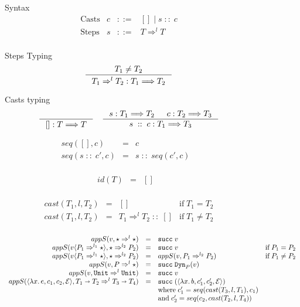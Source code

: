 \documentclass[acmsmall,review]{acmart}\settopmatter{printfolios=true,printccs=false,printacmref=false}
\newcommand{\stxrule}[3]{\text{#2} & #1 & ::= & #3\\}
\newcommand{\funrule}[3]{#1 &=& #2 & #3\\}
\newcommand{\judgeTypeFT}[3]{#1 : #2 \Longrightarrow #3} %
\newcommand{\POOunit}[0]{\mathtt{Unit}}
\newcommand{\POOfun}[2]{#1 \shortrightarrow #2}
\newcommand{\cOOcast}[3]{#1 \Rightarrow^{#2} #3}
\newcommand{\vOOcast}[2]{#1\langle#2\rangle}
\newcommand{\rOOsucc}[1]{\mathtt{succ}\;#1}
\newcommand{\hcvOOinj}[2]{\mathtt{Dyn}_{#1}(#2)}
\newcommand{\hcvOOfun}[5]{\langle \lambda #3.\, #4 , #1 , #5, #2 \rangle}
\newcommand{\sidecond}[1]{\text{if}\;#1}
\newcommand{\lsOOcast}[3]{\cOOcast{#1}{#2}{#3}}
\newcommand{\lcOOnull}[0]{[]}
\newcommand{\lcOOcons}[2]{#1 \; :: \; #2}
\begin{document}
\begin{figure}
Syntax
\[
\begin{array}{lrcl}
\stxrule{c}{Casts}{\lcOOnull{} \mid \lcOOcons{s}{c}}
\stxrule{s}{Steps}{\lsOOcast{T}{l}{T}}
\end{array}
\]

Steps Typing
\fbox{$\judgeTypeFT{s}{T}{T}$}
\begin{gather*}
\inference{
  T_1 \neq T_2
}{
  \judgeTypeFT{\lsOOcast{T_1}{l}{T_2}}{T_1}{T_2}
}
\end{gather*}

Casts typing
\fbox{$\judgeTypeFT{c}{T}{T}$}
\begin{gather*}
\inference{
}{
  \judgeTypeFT{\lcOOnull}{T}{T}
}
\quad
\inference{
  \judgeTypeFT{s}{T_1}{T_2} &
  \judgeTypeFT{c}{T_2}{T_3}
}{
  \judgeTypeFT{\lcOOcons{s}{c}}{T_1}{T_3}
}
\end{gather*}

\[
\begin{array}{rclr}
\funrule{seq(\lcOOnull,c)}{c}{}
\funrule{seq(\lcOOcons{s}{c'},c)}{\lcOOcons{s}{seq(c',c)}}{}
\end{array}
\]

\[
\begin{array}{rclr}
\funrule{id(T)}{\lcOOnull}{}
\end{array}
\]

\[
\begin{array}{rclc}
\funrule{cast(T_1,l,T_2)}{
  \lcOOnull
}{
  \sidecond{T_1 = T_2}
}
\funrule{cast(T_1,l,T_2)}{
  \lcOOcons{\lsOOcast{T_1}{l}{T_2}}{\lcOOnull}
}{
  \sidecond{T_1 \neq T_2}
}
\end{array}
\]

  
\[
\begin{array}{rclr}
\funrule{
  appS(v,\cOOcast{\star}{l}{\star})
}{
  \rOOsucc{v}
}{}
\funrule{
  appS(\vOOcast{v}{\cOOcast{P_1}{l_1}{\star}},\cOOcast{\star}{l_2}{P_2})
}{
  \rOOsucc{v}
}{\sidecond{P_1 = P_2}}
\funrule{
appS(\vOOcast{v}{\cOOcast{P_1}{l_1}{\star}},\cOOcast{\star}{l_2}{P_2})
}{
appS(v,\cOOcast{P_1}{l_2}{P_2})
}{\sidecond{P_1 \neq P_2}}
\funrule{
  appS(v,\cOOcast{P}{l}{\star})
}{
  \rOOsucc{\hcvOOinj{P}{v}}
}{}
\funrule{
  appS(v,\lsOOcast{\POOunit}{l}{\POOunit})
}{
  \rOOsucc{v}
}{}
\funrule{
  appS(
    \hcvOOfun{c_1}{\mathcal{E}}{x}{e}{c_2},
    \lsOOcast{\POOfun{T_1}{T_2}}{l}{\POOfun{T_3}{T_4}})
}{
  \rOOsucc{(\hcvOOfun{c_1'}{\mathcal{E}}{x}{b}{c_2'})}
}{
  \\ &&
  \text{where} \;
  c_1' = seq(cast(T_3,l,T_1),c_1)
  \\ &&
  \text{and} \;
  c_2' = seq(c_2,cast(T_2,l,T_4))
}


\end{array}\]
\end{figure}
\end{document}
